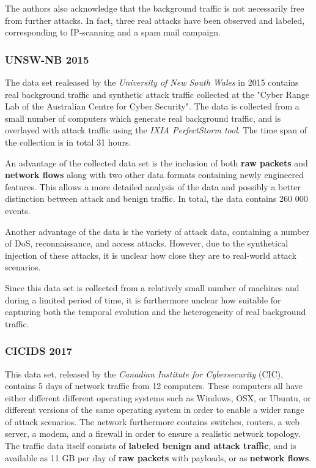 \documentclass[a4paper,12pt,twoside]{report}
\begin{document}
The authors also acknowledge that the background traffic is not necessarily free from further attacks. In fact, three real attacks have been observed and labeled, corresponding to IP-scanning and a spam mail campaign.

\subsubsection*{UNSW-NB 2015 \cite{moustafa_unsw-nb15:_2015}}

The data set realeased by the \textit{University of New South Wales} in 2015 contains real background traffic and synthetic attack traffic collected at the "Cyber Range Lab of the Australian Centre for Cyber Security". The data is collected from a small number of computers which generate real background traffic, and is overlayed with attack traffic using the \textit{IXIA PerfectStorm tool}. The time span of the collection is in total 31 hours.

An advantage of the collected data set is the inclusion of both \textbf{raw packets} and \textbf{network flows} along with two other data formats containing newly engineered features. This allows a more detailed analysis of the data and possibly a better distinction between attack and benign traffic. In total, the data contains 260 000 events.

Another advantage of the data is the variety of attack data, containing a number of DoS, reconnaissance, and access attacks. However, due to the synthetical injection of these attacks, it is unclear how close they are to real-world attack scenarios.

Since this data set is collected from a relatively small number of machines and during a limited period of time, it is furthermore unclear how suitable for capturing both the temporal evolution and the heterogeneity of real background traffic.

\subsubsection*{CICIDS 2017 \cite{gharib2016evaluation}\cite{sharafaldin2018towards}}

This data set, released by the \textit{Canadian Institute for Cybersecurity} (CIC), contains 5 days of network traffic from 12 computers. These computers all have either different different operating systems such as Windows, OSX, or Ubuntu, or different versions of the same operating system in order to enable a wider range of attack scenarios. The network  furthermore contains switches, routers, a web server, a modem, and a firewall in order to ensure a realistic network topology. The traffic data itself consists of \textbf{labeled benign and attack traffic}, and is available as 11 GB per day of \textbf{raw packets} with payloads, or as \textbf{network flows}. 
\end{document}
